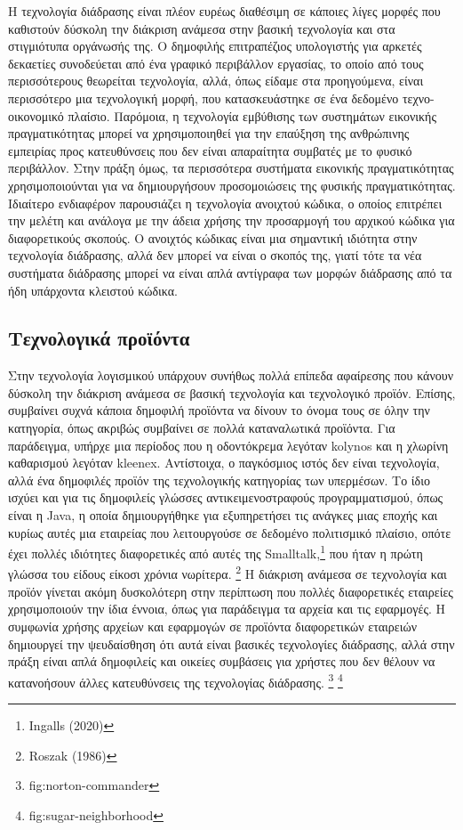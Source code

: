 \documentclass[
]{article}
\begin{document}
Η τεχνολογία διάδρασης είναι πλέον ευρέως διαθέσιμη σε κάποιες λίγες
μορφές που καθιστούν δύσκολη την διάκριση ανάμεσα στην βασική τεχνολογία
και στα στιγμιότυπα οργάνωσής της. Ο δημοφιλής επιτραπέζιος υπολογιστής
για αρκετές δεκαετίες συνοδεύεται από ένα γραφικό περιβάλλον εργασίας,
το οποίο από τους περισσότερους θεωρείται τεχνολογία, αλλά, όπως είδαμε
στα προηγούμενα, είναι περισσότερο μια τεχνολογική μορφή, που
κατασκευάστηκε σε ένα δεδομένο τεχνο-οικονομικό πλαίσιο. Παρόμοια, η
τεχνολογία εμβύθισης των συστημάτων εικονικής πραγματικότητας μπορεί να
χρησιμοποιηθεί για την επαύξηση της ανθρώπινης εμπειρίας προς
κατευθύνσεις που δεν είναι απαραίτητα συμβατές με το φυσικό περιβάλλον.
Στην πράξη όμως, τα περισσότερα συστήματα εικονικής πραγματικότητας
χρησιμοποιούνται για να δημιουργήσουν προσομοιώσεις της φυσικής
πραγματικότητας. Ιδιαίτερο ενδιαφέρον παρουσιάζει η τεχνολογία ανοιχτού
κώδικα, ο οποίος επιτρέπει την μελέτη και ανάλογα με την άδεια χρήσης
την προσαρμογή του αρχικού κώδικα για διαφορετικούς σκοπούς. Ο ανοιχτός
κώδικας είναι μια σημαντική ιδιότητα στην τεχνολογία διάδρασης, αλλά δεν
μπορεί να είναι ο σκοπός της, γιατί τότε τα νέα συστήματα διάδρασης
μπορεί να είναι απλά αντίγραφα των μορφών διάδρασης από τα ήδη υπάρχοντα
κλειστού κώδικα.

\hypertarget{ux3c4ux3b5ux3c7ux3bdux3bfux3bbux3bfux3b3ux3b9ux3baux3ac-ux3c0ux3c1ux3bfux3caux3ccux3bdux3c4ux3b1}{%
\subsection{Τεχνολογικά
προϊόντα}\label{ux3c4ux3b5ux3c7ux3bdux3bfux3bbux3bfux3b3ux3b9ux3baux3ac-ux3c0ux3c1ux3bfux3caux3ccux3bdux3c4ux3b1}}

Στην τεχνολογία λογισμικού υπάρχουν συνήθως πολλά επίπεδα αφαίρεσης που
κάνουν δύσκολη την διάκριση ανάμεσα σε βασική τεχνολογία και τεχνολογικό
προϊόν. Επίσης, συμβαίνει συχνά κάποια δημοφιλή προϊόντα να δίνουν το
όνομα τους σε όλην την κατηγορία, όπως ακριβώς συμβαίνει σε πολλά
καταναλωτικά προϊόντα. Για παράδειγμα, υπήρχε μια περίοδος που η
οδοντόκρεμα λεγόταν kolynos και η χλωρίνη καθαρισμού λεγόταν kleenex.
Αντίστοιχα, ο παγκόσμιος ιστός δεν είναι τεχνολογία, αλλά ένα δημοφιλές
προϊόν της τεχνολογικής κατηγορίας των υπερμέσων. Το ίδιο ισχύει και για
τις δημοφιλείς γλώσσες αντικειμενοστραφούς προγραμματισμού, όπως είναι η
Java, η οποία δημιουργήθηκε για εξυπηρετήσει τις ανάγκες μιας εποχής και
κυρίως αυτές μια εταιρείας που λειτουργούσε σε δεδομένο πολιτισμικό
πλαίσιο, οπότε έχει πολλές ιδιότητες διαφορετικές από αυτές της
Smalltalk,\footnote{Ingalls (2020)} που ήταν η πρώτη γλώσσα του είδους
είκοσι χρόνια νωρίτερα. \footnote{Roszak (1986)} Η διάκριση ανάμεσα σε
τεχνολογία και προϊόν γίνεται ακόμη δυσκολότερη στην περίπτωση που
πολλές διαφορετικές εταιρείες χρησιμοποιούν την ίδια έννοια, όπως για
παράδειγμα τα αρχεία και τις εφαρμογές. Η συμφωνία χρήσης αρχείων και
εφαρμογών σε προϊόντα διαφορετικών εταιρειών δημιουργεί την ψευδαίσθηση
ότι αυτά είναι βασικές τεχνολογίες διάδρασης, αλλά στην πράξη είναι απλά
δημοφιλείς και οικείες συμβάσεις για χρήστες που δεν θέλουν να
κατανοήσουν άλλες κατευθύνσεις της τεχνολογίας διάδρασης. \footnote{fig:norton-commander}
\footnote{fig:sugar-neighborhood}
\end{document}

